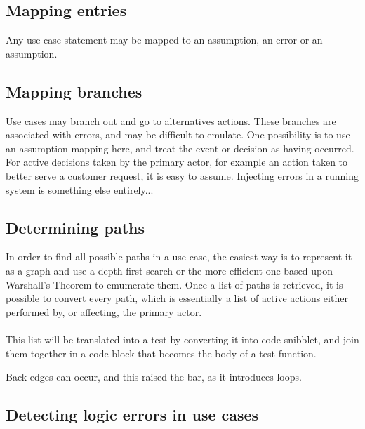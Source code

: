 
\subsection{Mapping entries}
Any use case statement may be mapped to an assumption, an error or an assumption.

\subsection{Mapping branches}
Use cases may branch out and go to alternatives actions. These branches are associated with errors, and may be difficult to emulate. One possibility is to use an assumption mapping here, and treat the event or decision as having occurred. For active decisions taken by the primary actor, for example an action taken to better serve a customer request, it is easy to assume. Injecting errors in a running system is something else entirely... %

\subsection{Determining paths}
In order to find all possible paths in a use case, the easiest way is to represent it as a graph and use a depth-first search or the more efficient one based upon Warshall's Theorem\cite{rubin1978enumerating} to emumerate them. Once a list of paths is retrieved, it is possible to convert every path, which is essentially a list of active actions either performed by, or affecting, the primary actor.\\\\
This list will be translated into a test by converting it into code snibblet, and join them together in a code block that becomes the body of a test function.

Back edges can occur, and this raised the bar, as it introduces loops.


\subsection{Detecting logic errors in use cases}

